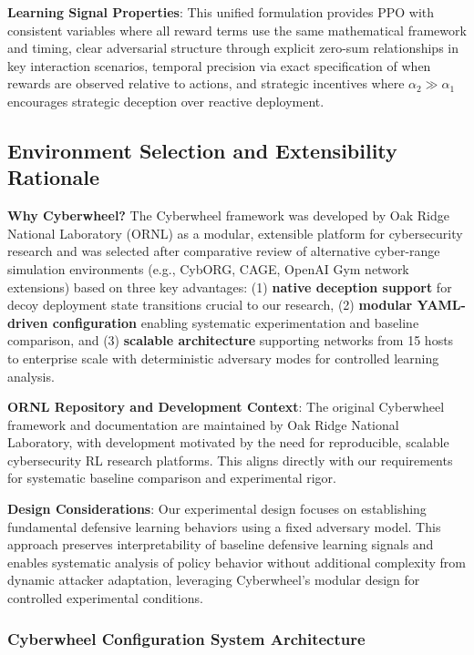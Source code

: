 \documentclass[12pt,oneside]{article}
\begin{document}
\textbf{Learning Signal Properties}: This unified formulation provides PPO with consistent variables where all reward terms use the same mathematical framework and timing, clear adversarial structure through explicit zero-sum relationships in key interaction scenarios, temporal precision via exact specification of when rewards are observed relative to actions, and strategic incentives where $\alpha_2 \gg \alpha_1$ encourages strategic deception over reactive deployment.


\subsection{Environment Selection and Extensibility Rationale}

\textbf{Why Cyberwheel?} The Cyberwheel framework was developed by Oak Ridge National Laboratory (ORNL) as a modular, extensible platform for cybersecurity research and was selected after comparative review of alternative cyber-range simulation environments (e.g., CybORG, CAGE, OpenAI Gym network extensions) based on three key advantages: (1) \textbf{native deception support} for decoy deployment state transitions crucial to our research, (2) \textbf{modular YAML-driven configuration} enabling systematic experimentation and baseline comparison, and (3) \textbf{scalable architecture} supporting networks from 15 hosts to enterprise scale with deterministic adversary modes for controlled learning analysis.

\textbf{ORNL Repository and Development Context}: The original Cyberwheel framework and documentation are maintained by Oak Ridge National Laboratory, with development motivated by the need for reproducible, scalable cybersecurity RL research platforms. This aligns directly with our requirements for systematic baseline comparison and experimental rigor.

\textbf{Design Considerations}: Our experimental design focuses on establishing fundamental defensive learning behaviors using a fixed adversary model. This approach preserves interpretability of baseline defensive learning signals and enables systematic analysis of policy behavior without additional complexity from dynamic attacker adaptation, leveraging Cyberwheel's modular design for controlled experimental conditions.

\subsubsection{Cyberwheel Configuration System Architecture}
\end{document}
